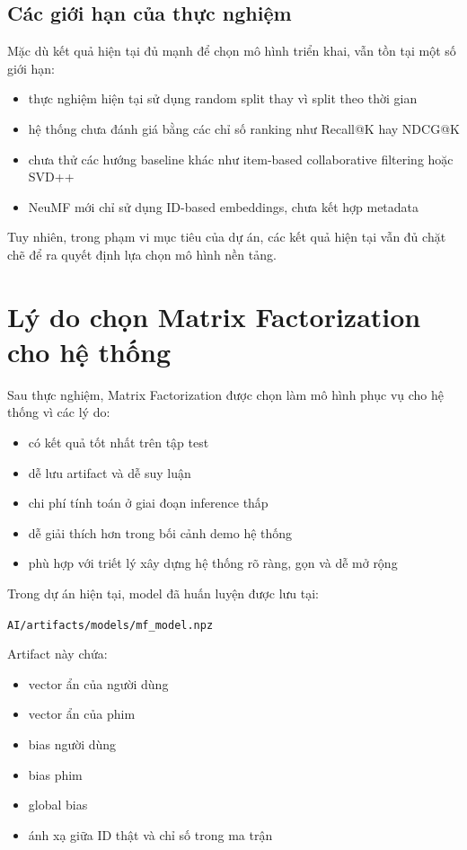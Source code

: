 \documentclass[12pt,a4paper]{article}
\begin{document}
\subsection{Các giới hạn của thực nghiệm}

Mặc dù kết quả hiện tại đủ mạnh để chọn mô hình triển khai, vẫn tồn tại một số giới hạn:

\begin{itemize}[leftmargin=1.5cm]
    \item thực nghiệm hiện tại sử dụng random split thay vì split theo thời gian
    \item hệ thống chưa đánh giá bằng các chỉ số ranking như Recall@K hay NDCG@K
    \item chưa thử các hướng baseline khác như item-based collaborative filtering hoặc SVD++
    \item NeuMF mới chỉ sử dụng ID-based embeddings, chưa kết hợp metadata
\end{itemize}

Tuy nhiên, trong phạm vi mục tiêu của dự án, các kết quả hiện tại vẫn đủ chặt chẽ để ra quyết định lựa chọn mô hình nền tảng.

\section{Lý do chọn Matrix Factorization cho hệ thống}

Sau thực nghiệm, Matrix Factorization được chọn làm mô hình phục vụ cho hệ thống vì các lý do:

\begin{itemize}[leftmargin=1.5cm]
    \item có kết quả tốt nhất trên tập test
    \item dễ lưu artifact và dễ suy luận
    \item chi phí tính toán ở giai đoạn inference thấp
    \item dễ giải thích hơn trong bối cảnh demo hệ thống
    \item phù hợp với triết lý xây dựng hệ thống rõ ràng, gọn và dễ mở rộng
\end{itemize}

Trong dự án hiện tại, model đã huấn luyện được lưu tại:

\begin{center}
\texttt{AI/artifacts/models/mf\_model.npz}
\end{center}

Artifact này chứa:

\begin{itemize}[leftmargin=1.5cm]
    \item vector ẩn của người dùng
    \item vector ẩn của phim
    \item bias người dùng
    \item bias phim
    \item global bias
    \item ánh xạ giữa ID thật và chỉ số trong ma trận
\end{itemize}
\end{document}
